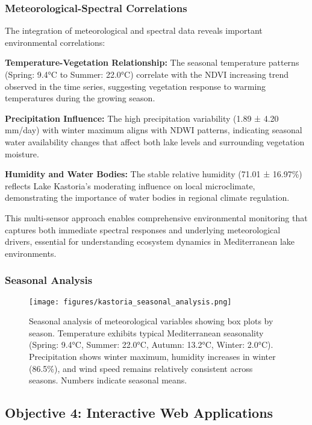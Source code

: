 \documentclass[a4paper,12pt]{article}
\begin{document}
\subsubsection{Meteorological-Spectral Correlations}

The integration of meteorological and spectral data reveals important
environmental correlations:

\textbf{Temperature-Vegetation Relationship:} The seasonal temperature patterns
(Spring: 9.4°C to Summer: 22.0°C) correlate with the NDVI increasing trend
observed in the time series, suggesting vegetation response to warming
temperatures during the growing season.

\textbf{Precipitation Influence:} The high precipitation variability (1.89 ±
4.20 mm/day) with winter maximum aligns with NDWI patterns, indicating seasonal
water availability changes that affect both lake levels and surrounding
vegetation moisture.

\textbf{Humidity and Water Bodies:} The stable relative humidity (71.01 ±
16.97\%) reflects Lake Kastoria's moderating influence on local microclimate,
demonstrating the importance of water bodies in regional climate regulation.

This multi-sensor approach enables comprehensive environmental monitoring that
captures both immediate spectral responses and underlying meteorological
drivers, essential for understanding ecosystem dynamics in Mediterranean
lake environments.

\subsubsection{Seasonal Analysis}

\begin{figure}[H]
    \centering
    \texttt{[image: figures/kastoria\_seasonal\_analysis.png]}
    \caption{Seasonal analysis of meteorological variables showing box plots by season. Temperature exhibits typical Mediterranean seasonality (Spring: 9.4°C, Summer: 22.0°C, Autumn: 13.2°C, Winter: 2.0°C). Precipitation shows winter maximum, humidity increases in winter (86.5\%), and wind speed remains relatively consistent across seasons. Numbers indicate seasonal means.}
    \label{fig:seasonal}
\end{figure}

\subsection{Objective 4: Interactive Web Applications}
\end{document}
